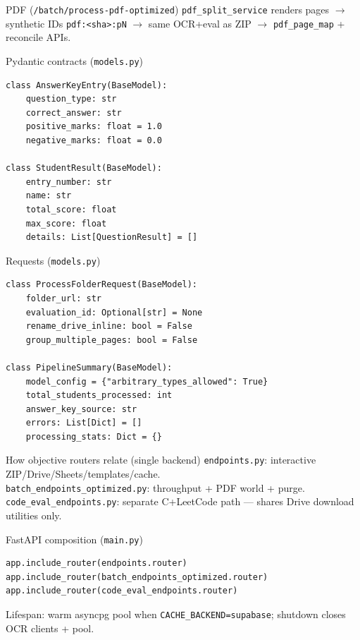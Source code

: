 \documentclass[aspectratio=169]{beamer}
\begin{document}
\begin{frame}{PDF (\texttt{/batch/process-pdf-optimized})}
  \footnotesize
  \texttt{pdf\_split\_service} renders pages $\rightarrow$ synthetic IDs \texttt{pdf:<sha>:pN} $\rightarrow$ same OCR+eval as ZIP $\rightarrow$ \texttt{pdf\_page\_map} + reconcile APIs.
\end{frame}

\begin{frame}[fragile]{Pydantic contracts (\texttt{models.py})}
\begin{lstlisting}[style=py]
class AnswerKeyEntry(BaseModel):
    question_type: str
    correct_answer: str
    positive_marks: float = 1.0
    negative_marks: float = 0.0

class StudentResult(BaseModel):
    entry_number: str
    name: str
    total_score: float
    max_score: float
    details: List[QuestionResult] = []
\end{lstlisting}
\end{frame}

\begin{frame}[fragile]{Requests (\texttt{models.py})}
\begin{lstlisting}[style=py]
class ProcessFolderRequest(BaseModel):
    folder_url: str
    evaluation_id: Optional[str] = None
    rename_drive_inline: bool = False
    group_multiple_pages: bool = False

class PipelineSummary(BaseModel):
    model_config = {"arbitrary_types_allowed": True}
    total_students_processed: int
    answer_key_source: str
    errors: List[Dict] = []
    processing_stats: Dict = {}
\end{lstlisting}
\end{frame}

\begin{frame}{How objective routers relate (single backend)}
  \small
  \texttt{endpoints.py}: interactive ZIP/Drive/Sheets/templates/cache.\\
  \texttt{batch\_endpoints\_optimized.py}: throughput + PDF world + purge.\\
  \texttt{code\_eval\_endpoints.py}: separate C+LeetCode path --- shares Drive download utilities only.
\end{frame}

\begin{frame}[fragile]{FastAPI composition (\texttt{main.py})}
\begin{lstlisting}[style=pys]
app.include_router(endpoints.router)
app.include_router(batch_endpoints_optimized.router)
app.include_router(code_eval_endpoints.router)
\end{lstlisting}
\vfill
\tiny Lifespan: warm asyncpg pool when \texttt{CACHE\_BACKEND=supabase}; shutdown closes OCR clients + pool.
\end{frame}
\end{document}
